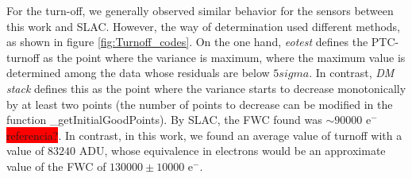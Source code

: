 For the turn-off, we generally observed similar behavior for the sensors between this work and SLAC. However, the way of determination used different methods, as shown in figure \ref{fig:Turnoff_codes}. On the one hand, \textit{eotest} defines the PTC-turnoff as the point where the variance is maximum, where the maximum value is determined among the data whose residuals are below $5sigma$. In contrast, \textit{DM stack} defines this as the point where the variance starts to decrease monotonically by at least two points (the number of points to decrease can be modified in the function \_getInitialGoodPoints). By SLAC, the FWC found was $\sim 90000$ e$^-$ \colorbox{red}{referencia?}. In contrast, in this work, we found an average value of turnoff with a value of $83240$ ADU, whose equivalence in electrons would be an approximate value of the FWC of $130000 \pm 10000$ e$^-$.

